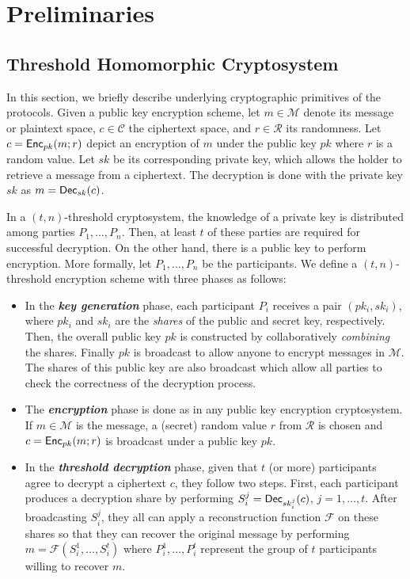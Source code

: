\documentclass[journal]{IEEEtran}
\begin{document}
\section{Preliminaries}

\subsection{Threshold Homomorphic Cryptosystem}

In this section, we briefly describe underlying cryptographic primitives of the protocols. Given a public key encryption scheme, let $m \in \mathcal{M}$ denote its message or plaintext space, $c \in \mathcal{C}$ the ciphertext space, and $r \in \mathcal{R}$ its randomness. Let $c=\text{\sf Enc}_{pk}(m;r)$ depict an encryption of $m$ under the public key $pk$ where $r$ is a random value. Let $sk$ be its corresponding private key, which allows the holder to retrieve a message from a ciphertext. The decryption is done with the private key $sk$ as $m=\text{\sf Dec}_{sk}(c)$.

In a $(t,n)$-threshold cryptosystem, the knowledge of a private key is distributed among parties $P_1,\ldots, P_n$. Then, at least $t$ of these parties are required for successful decryption. On the other hand, there is a public key to perform encryption. More formally, let $P_1,\ldots,P_n$ be the participants. We define a $(t,n)$-threshold encryption scheme with three phases as follows:

\begin{itemize}
  \item In the \emph{\textbf{key generation}} phase, each participant $P_i$ receives a pair $(pk_i,sk_i)$, where $pk_i$ and $sk_i$ are the \emph{shares} of the public and secret key, respectively. Then, the overall public key $pk$ is constructed by collaboratively \emph{combining} the shares. Finally $pk$ is broadcast to allow anyone to encrypt messages in $\mathcal{M}$. The shares of this public key are also broadcast which allow all parties to check the correctness of the decryption process.
  
  \item The \emph{\textbf{encryption}} phase is done as in any public key encryption cryptosystem. If $m\in\mathcal{M}$ is the message, a (secret) random value $r$ from $\mathcal{R}$ is chosen and $c=\text{\sf Enc}_{pk}(m;r)$ is broadcast under a public key $pk$.
	
  \item In the \emph{\textbf{threshold decryption}} phase, given that $t$ (or more) participants agree to decrypt a ciphertext $c$, they follow two steps. First, each participant produces a decryption share by performing $S_{i}^j=\text{\sf Dec}_{sk_{i}^j}(c)$, $j=1,\ldots,t$. After broadcasting $S_i^j$, they all can apply a reconstruction function $\mathcal{F}$ on these shares so that they can recover the original message by performing $m=\mathcal{F}(S_{i}^1,\ldots,S_{i}^t)$ where $P_{i}^1,\ldots,P_{i}^t$ represent the group of $t$ participants willing to recover $m$. 
\end{itemize}
\end{document}
